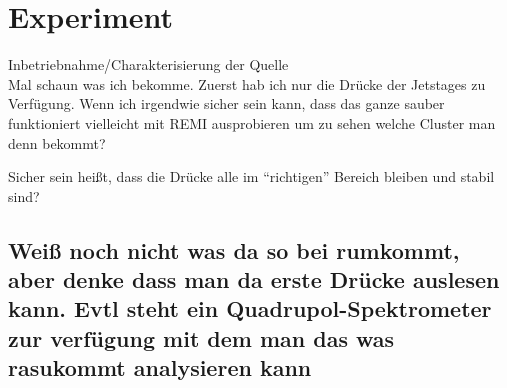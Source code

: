 \chapter{Experiment} 

Inbetriebnahme/Charakterisierung der Quelle\\

Mal schaun was ich bekomme. Zuerst hab ich nur die Drücke der Jetstages zu Verfügung. Wenn ich irgendwie sicher sein kann, dass das ganze sauber funktioniert vielleicht mit REMI ausprobieren um zu sehen welche Cluster man denn bekommt?

Sicher sein heißt, dass die Drücke alle im \enquote{richtigen} Bereich bleiben und stabil sind?

\section{Weiß noch nicht was da so bei rumkommt, aber denke dass man da erste Drücke auslesen kann. Evtl steht ein Quadrupol-Spektrometer zur verfügung mit dem man das was rasukommt analysieren kann}